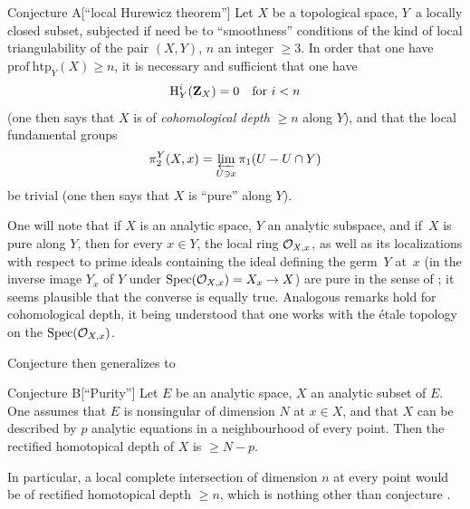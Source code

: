  \label{XIII.6.A}
\begin{enonce*}{Conjecture A}[``local Hurewicz theorem''\ndemark]
Let $X$ be a topological space, $Y$~a locally closed subset, subjected if need be to ``smoothness'' conditions of the kind of local triangulability of the pair $(X, Y)$, $n$ an integer $\geq 3$. In order that one have $\mathrm{prof\:htp}_Y(X)\geq n$, it is necessary and sufficient that one have
$$
\operatorname{H}^i_Y(\mathbf{Z}_X)=0\quad\text{for } i<n$$
(one then says that $X$ is of \emph{cohomological depth} $\geq n$ along $Y$), and that the local fundamental groups
$$
\pi_2^Y(X, x)=\varprojlim_{U\ni x} \pi_1(U-U\cap Y)$$
be trivial (one then says that $X$ is ``pure'' along $Y$).
\end{enonce*}

One will note that if $X$ is an analytic space, $Y$ an analytic subspace, and if~$X$ is pure along $Y$, then for every $x\in Y$, the local ring $\mathcal{O}_{X, x}$, as well as its localizations with respect to prime ideals containing the ideal defining the germ~$Y$ at~$x$ (\ie in the inverse image $Y_x$ of $Y$ under $\Spec(\OXx)=X_x\to X$) are pure in the sense of \Exp {}; it seems plausible that the converse is equally true. Analogous remarks hold for cohomological depth, it being understood that one works with the \'etale topology on the $\operatorname{Spec}(\mathcal{O}_{X, x})$.

Conjecture  then generalizes to

 \label{XIII.6.B}
\begin{enonce*}{Conjecture B}[``Purity''\ndemark]
Let $E$ be an analytic space, $X$ an analytic subset of $E$. One assumes that $E$ is nonsingular of dimension $N$ at $x\in X$, and that $X$ can be described by $p$ analytic equations in a neighbourhood of every point. Then the rectified homotopical depth of $X$ is $\geq N-p$.
\end{enonce*}

In particular, a local complete intersection of dimension $n$ at every point would be of rectified homotopical depth $\geq n$, which is nothing other than conjecture .


